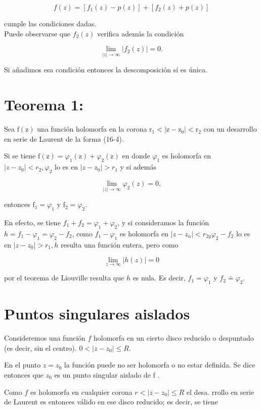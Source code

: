 \documentclass[10pt]{article}
\theoremstyle{plain}
\theoremstyle{definition}
\theoremstyle{remark}
\begin{document}
$$
f(z)=\left[f_{1}(z)-p(z)\right]+\left[f_{2}(z)+p(z)\right]
$$

cumple las condiciones dadas.\\
Puede observarse que $f_{2}(z)$ verifica además la condición

$$
\lim _{|z| \rightarrow \infty}\left|f_{2}(z)\right|=0 .
$$

Si añadimos esa condición entonces la descomposición sí es única.

\section*{Teorema 1:}
Sea $\mathrm{f}(\mathrm{z})$ una función holomorfa en la corona $\mathrm{r}_{1}<\left|\mathrm{z}-\mathrm{z}_{0}\right|<\mathrm{r}_{2}$ con un desarrollo en serie de Laurent de la forma (16-4).

Si se tiene $\mathrm{f}(\mathrm{z})=\varphi_{1}(\mathrm{z})+\varphi_{2}(\mathrm{z})$ en donde $\varphi_{1}$ es holomorfa en $\left|z-z_{0}\right|<r_{2}, \varphi_{2}$ lo es en $\left|z-z_{0}\right|>r_{1}$ y si además

$$
\lim _{|z| \rightarrow \infty} \varphi_{2}(z)=0,
$$

entonces $\mathrm{f}_{1}=\varphi_{1}$ y $\mathrm{f}_{2}=\varphi_{2}$.

En efecto, se tiene $f_{1}+f_{2}=\varphi_{1}+\varphi_{2}$, y si consideramos la función $h=f_{1}-\varphi_{1}=\varphi_{2}-f_{2}$, como $f_{1}-\varphi_{1}$ es holomorfa en $\left|z-z_{n}\right|<r_{2 y} \varphi_{2}-f_{2}$ lo es en $\left|z-z_{0}\right|>r_{1}, h$ resulta una función entera, pero como

$$
\lim _{z \rightarrow \infty}|h(z)|=0
$$

por el teorema de Liouville resulta que $h$ es nula. Es decir, $f_{1}=\varphi_{1}$ y $f_{2} \doteq \varphi_{2}$.

\section{Puntos singulares aislados}
Consideremos una función $f$ holomorfa en un cierto disco reducido o despuntado (es decir, sin el centro). $0<\left|z-z_{0}\right| \leqslant R$.

En el punto $z=z_{0}$ la función puede no ser holomorfa o no estar definida. Se dice entonces que $z_{0}$ es un punto singular aislado de f .

Como $f$ es holomorfa en cualquier corona $r<\left|z-z_{0}\right| \leqslant R$ el desa. rrollo en serie de Laurent es entonces válido en ese disco reducido; es decir, se tiene
\end{document}
